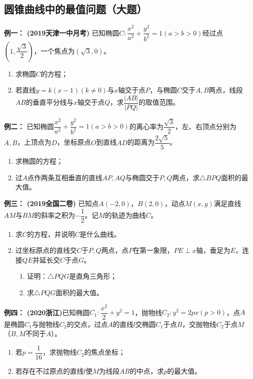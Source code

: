 \documentclass{article}
\begin{document}
\subsection{圆锥曲线中的最值问题（大题）}

\textbf{例一： (2019天津一中月考)} 已知椭圆$C:\dfrac{x^2}{a^2}+\dfrac{y^2}{b^2}=1(a>b>0)$经过点$\left(1,\dfrac{\sqrt{3}}{2}\right)$，一个焦点为$(\sqrt{3},0)$。
\begin{enumerate}[label=(\Roman*)]
    \item 求椭圆$C$的方程；
    \item 若直线$y=k(x-1)(k\neq0)$与$x$轴交于点$P$，与椭圆$C$交于$A,B$两点，线段$AB$的垂直平分线与$x$轴交于点$Q$，求$\dfrac{|AB|}{|PQ|}$的取值范围。
\end{enumerate}

\vspace{18\baselineskip}

\textbf{例二： } 已知椭圆$\dfrac{x^2}{a^2}+\dfrac{y^2}{b^2}=1(a>b>0)$的离心率为$\dfrac{\sqrt{3}}{2}$，左、右顶点分别为$A,B$，上顶点为$D$，坐标原点$O$到直线$AD$的距离为$\dfrac{2\sqrt{5}}{5}$。
\begin{enumerate}[label=(\Roman*)]
    \item 求椭圆的方程；
    \item 过$A$点作两条互相垂直的直线$AP,AQ$与椭圆交于$P,Q$两点，求$\triangle BPQ$面积的最大值。
\end{enumerate}

\newpage

\textbf{例三： (2019全国二卷)} 已知点$A(-2,0)$，$B(2,0)$，动点$M(x,y)$满足直线$AM$与$BM$的斜率之积为$-\dfrac{1}{2}$。记$M$的轨迹为曲线$C$。
\begin{enumerate}[label=(\Roman*)]
    \item 求$C$的方程，并说明$C$是什么曲线。
    \item 过坐标原点的直线交$C$于$P,Q$两点，点$P$在第一象限，$PE \perp x$轴，垂足为$E$，连接$QE$并延长交$C$于点$G$。
    \begin{enumerate}[label=(\roman*)]
        \item 证明：$\triangle PQG$是直角三角形；
        \item 求$\triangle PQG$面积的最大值。
    \end{enumerate}
\end{enumerate}

\vspace{18\baselineskip}

\textbf{例四： (2020浙江)}已知椭圆$C_1:\dfrac{x^2}{2} + y^2 = 1$，抛物线$C_2:y^2 = 2px(p>0)$，点$A$是椭圆$C_1$与抛物线$C_2$的交点，过点$A$的直线$l$交椭圆$C_1$于点$B$，交抛物线$C_2$于点$M$（$B,M$不同于$A$）。
    \begin{enumerate}[label=(\arabic*)]
        \item 若$p = \dfrac{1}{16}$，求抛物线$C_2$的焦点坐标；
        \item 若存在不过原点的直线$l$使$M$为线段$AB$的中点，求$p$的最大值。
    \end{enumerate}
\end{document}
